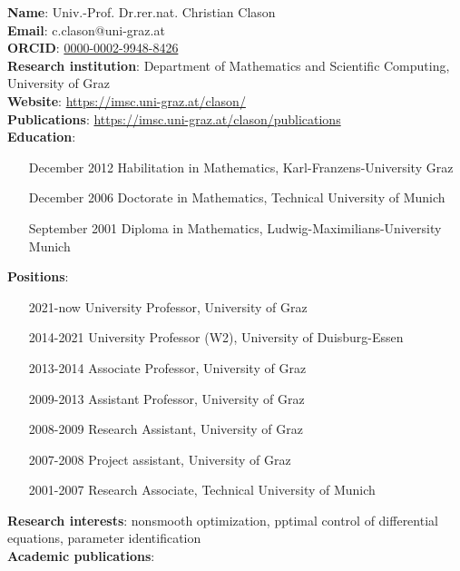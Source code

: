 \documentclass[a4paper,11pt]{scrartcl}
\begin{document}
\textbf{Name}:  Univ.-Prof. Dr.rer.nat.  Christian Clason  \\
\textbf{Email}: c.clason@uni-graz.at \\
\textbf{ORCID}: \href{https://orcid.org/0000-0002-9948-8426}{0000-0002-9948-8426} \\
\textbf{Research institution}: Department of Mathematics and Scientific Computing, University of Graz \\
\textbf{Website}: \url{https://imsc.uni-graz.at/clason/} \\
\textbf{Publications}: \url{https://imsc.uni-graz.at/clason/publications} \\
\textbf{Education}:
\begin{enumerate}[leftmargin=2.5cm]
    \item[December 2012] Habilitation in Mathematics, Karl-Franzens-University Graz
    \item[December 2006] Doctorate in Mathematics, Technical University of Munich
    \item[September 2001] Diploma in Mathematics, Ludwig-Maximilians-University Munich
\end{enumerate}
\textbf{Positions}:
\begin{enumerate}[leftmargin=2.5cm]
    \item[2021-now] University Professor, University of Graz
    \item[2014-2021] University Professor (W2), University of Duisburg-Essen
    \item[2013-2014] Associate Professor, University of Graz
    \item[2009-2013] Assistant Professor, University of Graz
    \item[2008-2009] Research Assistant, University of Graz
    \item[2007-2008] Project assistant, University of Graz
    \item[2001-2007] Research Associate, Technical University of Munich
\end{enumerate}
\textbf{Research interests}: nonsmooth optimization, pptimal control of differential equations, parameter identification \\
\textbf{Academic publications}:
\end{document}
